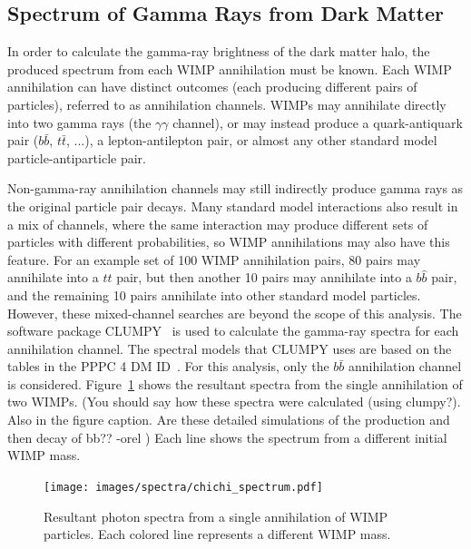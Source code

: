   
  \FloatBarrier
  
    
  \subsection{Spectrum of Gamma Rays from Dark Matter}\label{dm_spectral}
    In order to calculate the gamma-ray brightness of the dark matter halo, the produced spectrum from each WIMP annihilation must be known.
    Each WIMP annihilation can have distinct outcomes (each producing different pairs of particles), referred to as annihilation channels.
    WIMPs may annihilate directly into two gamma rays (the $\gamma\gamma$ channel), or may instead produce a quark-antiquark pair ($b\bar{b}$, $t\bar{t}$, ...), a lepton-antilepton pair, or almost any other standard model particle-antiparticle pair.

    Non-gamma-ray annihilation channels may still indirectly produce gamma rays as the original particle pair decays.
    Many standard model interactions also result in a mix of channels, where the same interaction may produce different sets of particles with different probabilities, so WIMP annihilations may also have this feature.
    For an example set of 100 WIMP annihilation pairs, 80 pairs may annihilate into a $t\hat{t}$ pair, but then another 10 pairs may annihilate into a $b\hat{b}$ pair, and the remaining 10 pairs annihilate into other standard model particles.
    However, these mixed-channel searches are beyond the scope of this analysis.
    The software package CLUMPY~\cite{CLUMPYcode} is used to calculate the gamma-ray spectra for each annihilation channel.
    The spectral models that CLUMPY uses are based on the tables in the PPPC 4 DM ID~\cite{pppc4_dm_spectra}.
    For this analysis, only the $b\bar{b}$ annihilation channel is considered.
    Figure~\ref{fig:chichi_spectrum} shows the resultant spectra from the single annihilation of two WIMPs.
    {\color{red}(You should say how these spectra were calculated (using clumpy?). Also in the figure caption. Are these detailed simulations of the production and then decay of bb?? -orel )}
    Each line shows the spectrum from a different initial WIMP mass.

    \begin{figure}[ht]
      \centering
      \texttt{[image: images/spectra/chichi\_spectrum.pdf]}
      \caption[Single Annihilation Spectra]{
        Resultant photon spectra from a single annihilation of WIMP particles.
        Each colored line represents a different WIMP mass.}
      \label{fig:chichi_spectrum}
    \end{figure}



